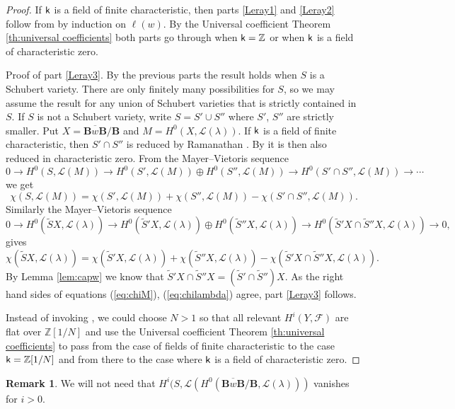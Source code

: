 \documentclass[sn-mathphys-num]{sn-jnl}%
\newcommand\F{{\mathcal F}}
\newcommand{\Ll}{\mathcal L}
\newcommand{\sk}{{\sf k}}
\newcommand{\Z}{{\mathbb Z}}
\newcommand{\fb}{\mathbf B}
\theoremstyle{definition}
\newtheorem{remark}[theorem]{Remark}
\begin{document}
\begin{proof}
If $\sk$ is a field of finite characteristic,
then parts \ref{Leray1} and \ref{Leray2} follow from \cite[Proposition 2.24, Theorem 1.9.(a)(ii)]{WvdK}  by induction on $\ell(w)$.
By the Universal coefficient Theorem \ref{th:universal coefficients}
both parts go through when $\sk=\Z$ or when $\sk$ is a field of characteristic zero.

Proof of part \ref{Leray3}. By the previous parts the result holds when $S$ is a Schubert variety. 
There are only finitely many possibilities for $S$, so we may assume the result for any union of Schubert varieties that is
strictly contained in $S$. If $S$ is not a Schubert variety, write $S=S'\cup S''$ where $S'$, $S''$ are strictly smaller.
Put $X=\overline{{\fb}w{\fb}}/\fb$
and $M=H^0(X,\Ll(\lambda))$.
If $\sk$ is a field of finite characteristic, then $S'\cap S''$ is reduced by Ramanathan \cite[Proposition 1.2.1, Chapter 2]{BK}. By \cite[Corollary 1.6.6]{BK}
it is then also reduced in characteristic zero.
From the Mayer--Vietoris sequence 
$$0\to  H^0(S,\Ll(M))\to H^0(S',\Ll(M))\oplus H^0(S'',\Ll(M))\to H^0(S'\cap S'',\Ll(M))\to\cdots$$
we get
\begin{equation}\label{eq:chiM}
    \chi(S,\Ll(M))=\chi(S',\Ll(M))+\chi(S'',\Ll(M))- \chi(S'\cap S'',\Ll(M)).
\end{equation}
Similarly the Mayer--Vietoris sequence 
$$0\to H^0(\tilde SX ,\Ll(\lambda))\to H^0(\tilde S'X ,\Ll(\lambda))\oplus H^0(\tilde S''X ,\Ll(\lambda))\to H^0(\tilde S'X\cap \tilde S''X ,\Ll(\lambda))\to0,$$ 
gives 
\begin{equation}\label{eq:chilambda}
    \chi(\tilde SX ,\Ll(\lambda))=\chi(\tilde S'X ,\Ll(\lambda)) + \chi (\tilde S''X ,\Ll(\lambda))- \chi(\tilde S'X\cap \tilde S''X ,\Ll(\lambda))
.\end{equation}
By Lemma \ref{lem:capw} we know that $\tilde S'X\cap \tilde S''X =(\tilde S'\cap \tilde S'')X $.
As the right hand sides of equations (\ref{eq:chiM}), (\ref{eq:chilambda})
agree, part \ref{Leray3} follows.

Instead of invoking \cite[Corollary 1.6.6]{BK}, we could choose $N>1$ so that all relevant $H^i(Y,\F)$ are flat over $\Z[1/N]$ and use the Universal coefficient Theorem \ref{th:universal coefficients}
to pass from the case of fields of finite characteristic to the case $\sk=\Z[1/N]$ and from there to the case where $\sk$ is a field of characteristic zero.
\end{proof}

\begin{remark}
    We will not need that 
    $H^i(S,\Ll(H^0({\overline{{\fb}w{\fb}}/{\fb}},\Ll(\lambda)))$ vanishes for $i>0$.
\end{remark}
\end{document}

